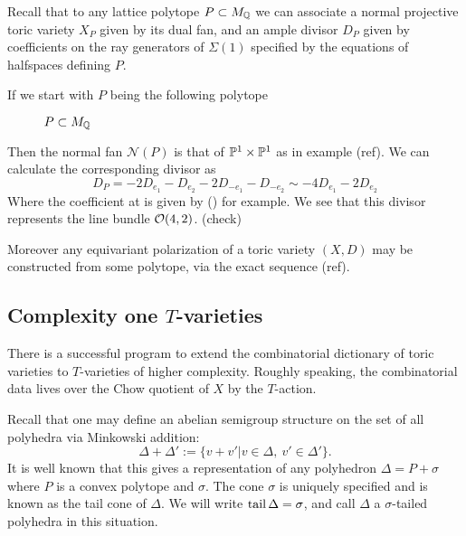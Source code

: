 Recall that to any lattice polytope \(P \subset M_{\mathbb{Q}}\) we can associate a normal projective toric variety \(X_P\) given by its dual fan, and an ample divisor \(D_P\) given by coefficients on the ray generators of \(\Sigma(1)\) specified by the equations of halfspaces defining \(P\).
\begin{example}
If we start with \(P\) being the following polytope
\begin{figure}[h]
\centering
	\caption*{$P \subset M_{\mathbb{Q}}$}
\end{figure}

Then the normal fan \(\mathcal{N}(P)\) is that of \(\mathbb{P}^1 \times \mathbb{P}^1\) as in example (ref). We can calculate the corresponding divisor as
\[
D_P = -2D_{e_1} - D_{e_2} -2 D_{-e_1} - D_{-e_2}  \sim -4 D_{e_1} -2 D_{e_2} 
\]
Where the coefficient at is given by () for example. We see that this divisor represents the line bundle \(\mathcal{O}(4,2)\). (check)
\end{example}
Moreover any equivariant polarization of a toric variety \((X,D)\) may be constructed from some polytope, via the exact sequence (ref).
\subsection{Complexity one $T$-varieties}
There is a successful program to extend the combinatorial dictionary of toric varieties to \(T\)-varieties of higher complexity. Roughly speaking, the combinatorial data lives over the Chow quotient of \(X\) by the \(T\)-action.

Recall that one may define an abelian semigroup structure on the set of all polyhedra via Minkowski addition:
\[
\Delta + \Delta' := \{ v + v' | v \in \Delta, \ v' \in \Delta' \}.
\]
It is well known that this gives a representation of any polyhedron \(\Delta = P + \sigma \) where \(P\) is a convex polytope and \(\sigma\). The cone \(\sigma\) is uniquely specified and is known as the tail cone of \(\Delta\). We will write \(\operatorname{tail} \Delta = \sigma\), and call \(\Delta\) a \(\sigma\)-tailed polyhedra in this situation.

